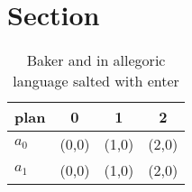 \documentclass[a4paper]{article}
\begin{document}
\section{Section}

\begin{table}
\begin{adjustbox}{width=0.6\columnwidth}
\begin{tabular}{|l|l|l|l|}
\hline
\textbf{plan} & \multicolumn{1}{c|}{\textbf{0}} & \multicolumn{1}{c|}{\textbf{1}} & \multicolumn{1}{c|}{\textbf{2}} \\ \hline
\textbf{$a_0$}  & (0,0) & (1,0) & (2,0) \\ \hline
\textbf{$a_1$}  & (0,0) & (1,0) & (2,0) \\ \hline
\end{tabular}
\end{adjustbox}
\caption{Baker and in allegoric language salted with enter
}
\end{table}
\end{document}

